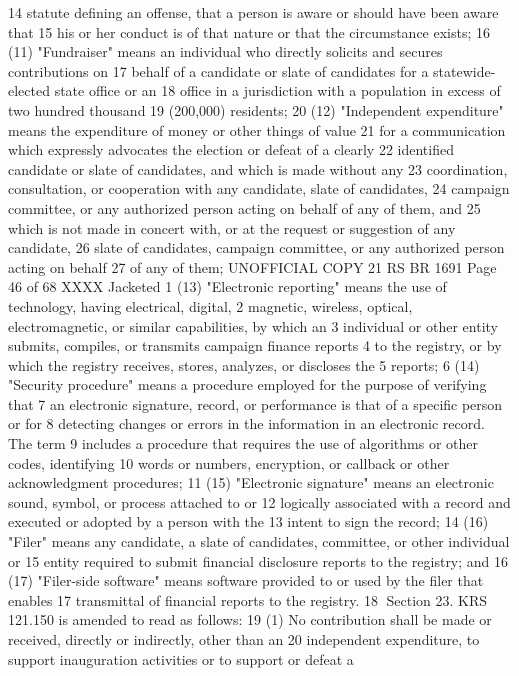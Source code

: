 14 statute defining an offense, that a person is aware or should have been aware that
15 his or her conduct is of that nature or that the circumstance exists;
16 (11) "Fundraiser" means an individual who directly solicits and secures contributions on
17 behalf of a candidate or slate of candidates for a statewide-elected state office or an
18 office in a jurisdiction with a population in excess of two hundred thousand
19 (200,000) residents;
20 (12) "Independent expenditure" means the expenditure of money or other things of value
21 for a communication which expressly advocates the election or defeat of a clearly
22 identified candidate or slate of candidates, and which is made without any
23 coordination, consultation, or cooperation with any candidate, slate of candidates,
24 campaign committee, or any authorized person acting on behalf of any of them, and
25 which is not made in concert with, or at the request or suggestion of any candidate,
26 slate of candidates, campaign committee, or any authorized person acting on behalf
27 of any of them;
UNOFFICIAL COPY 21 RS BR 1691
Page 46 of 68
XXXX Jacketed
1 (13) "Electronic reporting" means the use of technology, having electrical, digital,
2 magnetic, wireless, optical, electromagnetic, or similar capabilities, by which an
3 individual or other entity submits, compiles, or transmits campaign finance reports
4 to the registry, or by which the registry receives, stores, analyzes, or discloses the
5 reports;
6 (14) "Security procedure" means a procedure employed for the purpose of verifying that
7 an electronic signature, record, or performance is that of a specific person or for
8 detecting changes or errors in the information in an electronic record. The term
9 includes a procedure that requires the use of algorithms or other codes, identifying
10 words or numbers, encryption, or callback or other acknowledgment procedures;
11 (15) "Electronic signature" means an electronic sound, symbol, or process attached to or
12 logically associated with a record and executed or adopted by a person with the
13 intent to sign the record;
14 (16) "Filer" means any candidate, a slate of candidates, committee, or other individual or
15 entity required to submit financial disclosure reports to the registry; and
16 (17) "Filer-side software" means software provided to or used by the filer that enables
17 transmittal of financial reports to the registry.
18 Section 23. KRS 121.150 is amended to read as follows:
19 (1) No contribution shall be made or received, directly or indirectly, other than an
20 independent expenditure, to support inauguration activities or to support or defeat a
